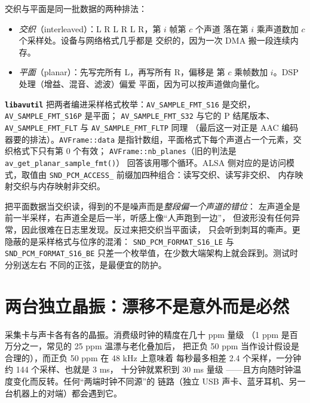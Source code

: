 \documentclass[12pt,a4paper,fontset=fandol]{ctexbook}
\newcommand{\Fn}[1]{\texttt{#1()}}
\newcommand{\Tp}[1]{\texttt{#1}}
\newcommand{\Bk}{\discretionary{}{}{}}
\newcommand{\Lib}[1]{\textbf{\texttt{#1}}}
\begin{document}
交织与平面是同一批数据的两种排法：

\begin{itemize}
  \item \emph{交织}（interleaved）：L R L R L R，第 $i$ 帧第 $c$ 个声道
        落在第 $i$ 乘声道数加 $c$ 个采样处。设备与网络格式几乎都是
        交织的，因为一次 DMA 搬一段连续内存。
  \item \emph{平面}（planar）：先写完所有 L，再写所有 R，偏移是
        第 $c$ 乘帧数加 $i$。DSP 处理（增益、混音、滤波）偏爱
        平面，因为可以按声道做向量化。
\end{itemize}

\Lib{libavutil}{} 把两者编进采样格式枚举：\Tp{AV\_{\Bk}SAMPLE\_{\Bk}FMT\_{\Bk}S16}
是交织，\Tp{AV\_{\Bk}SAMPLE\_{\Bk}FMT\_{\Bk}S16P} 是平面；
\Tp{AV\_{\Bk}SAMPLE\_{\Bk}FMT\_{\Bk}S32} 与它的 P 结尾版本、
\Tp{AV\_{\Bk}SAMPLE\_{\Bk}FMT\_{\Bk}FLT} 与 \Tp{AV\_{\Bk}SAMPLE\_{\Bk}FMT\_{\Bk}FLTP} 同理
（最后这一对正是 AAC 编码器要的排法）。\Tp{AVFrame::data}
是指针数组，平面格式下每个声道占一个元素，交织格式下只有第 0 个有效；
\Tp{AVFrame::nb\_{\Bk}planes}（旧的判法是 \Fn{av\_{\Bk}get\_{\Bk}planar\_{\Bk}sample\_{\Bk}fmt}）
回答该用哪个循环。ALSA 侧对应的是访问模式，取值由
\Tp{SND\_{\Bk}PCM\_{\Bk}ACCESS\_{\Bk}} 前缀加四种组合：读写交织、读写非交织、
内存映射交织与内存映射非交织。

\begin{warning}[title={格式假设的两种失败方式}]
把平面数据当交织读，得到的不是噪声而是\emph{整段偏一个声道的错位}：
左声道全是前一半采样，右声道全是后一半，听感上像``人声跑到一边''，
但波形没有任何异常，因此很难在日志里发现。反过来把交织当平面读，
只会听到刺耳的嘶声。更隐蔽的是采样格式与位序的混淆：
\Tp{SND\_PCM\_FORMAT\_S16\_LE} 与 \Tp{SND\_PCM\_FORMAT\_S16\_BE}
只差一个枚举值，在少数大端架构上就会踩到。测试时分别送左右
不同的正弦，是最便宜的防护。
\end{warning}

\section{两台独立晶振：漂移不是意外而是必然}
\label{sec:ch02-drift}

采集卡与声卡各有各的晶振。消费级时钟的精度在几十 ppm 量级
（1 ppm 是百万分之一，常见的 25 ppm 温漂与老化叠加后，
把正负 50 ppm 当作设计假设是合理的），而正负 50 ppm 在 48 kHz 上意味着
每秒最多相差 2.4 个采样，一分钟约 144 个采样、也就是 3 ms，
十分钟就累积到 30 ms 量级
——且方向随时钟温度变化而反转。任何``两端时钟不同源''的
链路（独立 USB 声卡、蓝牙耳机、另一台机器上的对端）都会遇到它。
\end{document}
